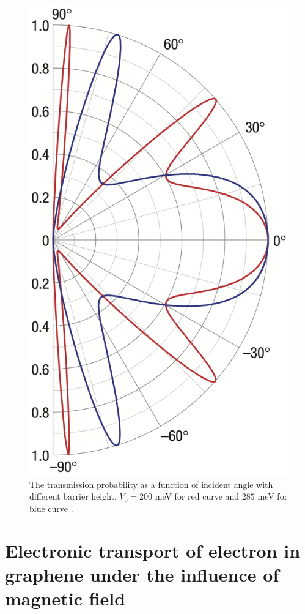     \begin{figure}[H]
        \centering
        \includegraphics[width = 0.3\linewidth]{fig/Chap 2/klein tunneling.png}
        \caption{The transmission probability as a function of incident angle with different barrier height. 
                    $V_0 = 200$ meV for red curve and $285$ meV for blue curve \cite{Katsnelson2006a}.}
        \label{2fig:Klein tunneling}
    \end{figure}

\section{Electronic transport of electron in graphene under the influence of magnetic field} \label{2sec:transport in B field}

